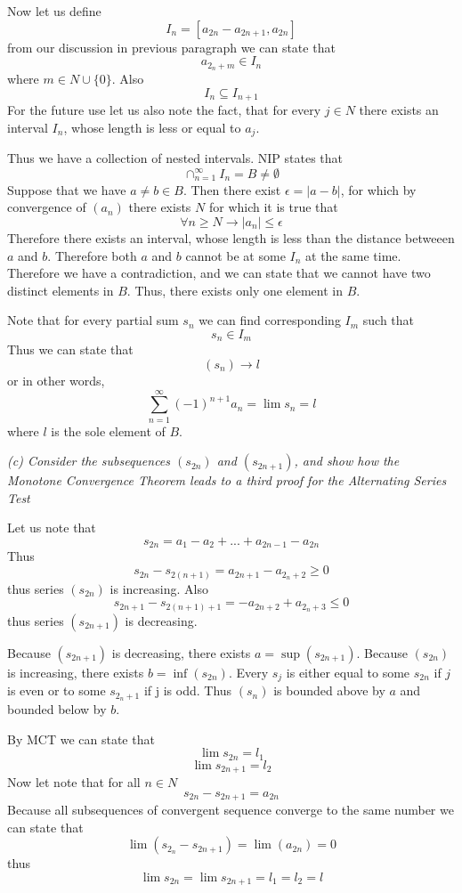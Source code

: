\documentclass[11pt,oneside,titlepage]{article}
\begin{document}
Now let us define
$$I_n = [a_{2n} - a_{2n + 1}, a_{2n}]$$
from our discussion in previous paragraph we can state that
$$a_{2_n + m} \in I_n$$
where $m \in N \cup \{0\}$. Also
$$I_n \subseteq I_{n+1}$$
For the future use let us also note the fact, that for every $j \in N$ there
exists an interval $I_n$, whose length is less or equal to $a_j$.

Thus we have a collection of nested intervals. NIP states that
$$\cap_{n = 1}^{\infty} I_n = B \neq \emptyset$$
Suppose that we have $a \neq b \in B$. Then there exist $\epsilon = |a - b|$,
for which by convergence of $(a_n)$ there exists $N$ for which it is true that
$$\forall n \geq N \to |a_n| \leq \epsilon$$
Therefore there exists  an interval, whose length is less than the distance
betweeen $a$ and $b$. Therefore both $a$ and $b$  cannot be at some $I_n$ at
the same time. Therefore  we have a contradiction, and we can state that we
cannot have two distinct elements in $B$. Thus,  there exists
only one element in $B$.

Note that for every partial sum $s_n$ we can find corresponding $I_m$ such that
$$s_n \in I_m$$
Thus we can state that
$$(s_n)\to l$$
or in other words, 
$$\sum_{n = 1}^{\infty} (-1)^{n + 1}a_n = \lim s_n = l$$
where $l$ is the sole element of $B$.

\textit{(c) Consider the subsequences $(s_{2n})$ and $(s_{2n + 1})$, and show
  how the Monotone Convergence Theorem leads to a third proof for the
  Alternating Series Test}

Let us note that
$$s_{2n} = a_1 - a_2 + ... + a_{2n - 1} - a_{2n}$$
Thus
$$s_{2n} - s_{2(n + 1)} = a_{2n + 1} - a_{2_n + 2} \geq 0$$
thus series $(s_{2n})$ is increasing. Also
$$s_{2n + 1 } - s_{2(n + 1) + 1} = - a_{2n + 2} + a_{2_n + 3} \leq 0$$
thus series $(s_{2n + 1})$ is decreasing.

Because $(s_{2n + 1})$ is decreasing, there exists $a = \sup(s_{2n + 1})$.
Because $(s_{2n})$ is increasing, there exists $b = \inf(s_{2n})$.
Every $s_j$ is either equal to some $s_{2n}$ if $j$ is even or to some
$s_{2_n + 1}$ if j is odd. Thus $(s_n)$ is bounded above by $a$ and bounded
below by $b$.

By MCT we can state that 
$$\lim s_{2n} = l_1$$
$$\lim s_{2n + 1} = l_2 $$
Now let note that for all $n \in N$
$$s_{2n} - s_{2n + 1} = a_{2n}$$
Because all subsequences of convergent sequence converge to the same number
we can state that 
$$\lim(s_{2_n} - s_{2n + 1}) = \lim(a_{2n}) = 0$$
thus
$$\lim s_{2n} = \lim s_{2n + 1} = l_1 = l_2 = l$$
\end{document}
